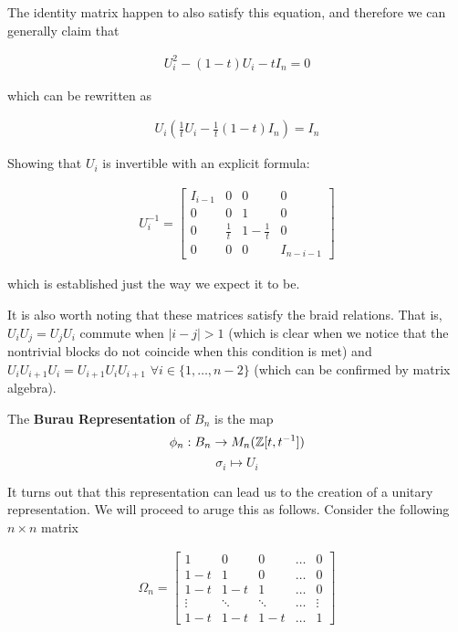 The identity matrix happen to also satisfy this equation, and therefore we can generally claim that 

\begin{equation}
\begin{aligned}
	U_i^2 - (1-t)U_i - tI_n = 0
\end{aligned}
\end{equation}

which can be rewritten as 

\begin{equation}
\begin{aligned}
	U_i(\frac{1}{t}U_i - \frac{1}{t}(1-t)I_n) =I_n 
\end{aligned}
\end{equation}

Showing that $U_i$ is invertible with an explicit formula:

\begin{equation}
\begin{aligned}
	U_i^{-1}=\begin{bmatrix}
			I_{i-1}& 0 & 0 & 0 \\
			0 & 0 & 1 & 0\\
			0 & \frac{1}{t} & 1-\frac{1}{t} & 0\\
			0 & 0 & 0 & I_{n-i-1}
		\end{bmatrix}
\end{aligned}
\end{equation}

which is established just the way we expect it to be.

It is also worth noting that these matrices satisfy the braid relations. That is, $U_iU_j=U_jU_i$ commute when $|i-j|>1$ (which is clear when we notice that the nontrivial blocks do not coincide when this condition is met) and $U_iU_{i+1}U_i=U_{i+1}U_iU_{i+1}$ $\forall i\in\{1,\hdots,n-2\}$ (which can be confirmed by matrix algebra).

\begin{definition}
	The \textbf{Burau Representation} of $B_n$ is the map 
$$\phi_n:B_n\rightarrow M_n(\mathbb{Z}[t,t^{-1}])$$
$$\sigma_i \mapsto U_i$$
\end{definition}

It turns out that this representation can lead us to the creation of a unitary representation. We will proceed to aruge this as follows. Consider the following $n\times n$ matrix

\begin{equation}
\begin{aligned}
	\Omega_n = \begin{bmatrix}
						1 & 0 & 0 &\hdots & 0 \\
						1-t & 1 & 0 & \hdots & 0 \\
						1-t & 1-t & 1 & \hdots & 0 \\
						\vdots&\ddots&\ddots&\hdots&\vdots\\
						1-t & 1-t & 1-t & \hdots & 1
					\end{bmatrix}
\end{aligned}
\end{equation}\\

